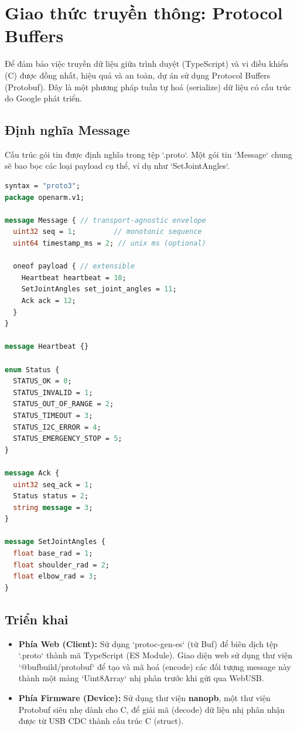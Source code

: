 \documentclass[12pt, a4paper, oneside]{report}
\numberwithin{equation}{chapter} %
\numberwithin{figure}{chapter}   %
\numberwithin{table}{chapter}    %
\begin{document}
\section{Giao thức truyền thông: Protocol Buffers}

Để đảm bảo việc truyền dữ liệu giữa trình duyệt (TypeScript) và vi điều khiển (C) được đồng nhất, hiệu quả và an toàn, dự án sử dụng Protocol Buffers (Protobuf). Đây là một phương pháp tuần tự hoá (serialize) dữ liệu có cấu trúc do Google phát triển.

\subsection{Định nghĩa Message}
Cấu trúc gói tin được định nghĩa trong tệp `.proto`. Một gói tin `Message` chung sẽ bao bọc các loại payload cụ thể, ví dụ như `SetJointAngles`.

\begin{lstlisting}[language=protobuf, caption={Định nghĩa gói tin trong tệp \texttt{messages.proto}}, label={lst:proto-def}, float=H]
syntax = "proto3";
package openarm.v1;

message Message { // transport-agnostic envelope
  uint32 seq = 1;         // monotonic sequence
  uint64 timestamp_ms = 2; // unix ms (optional)
  
  oneof payload { // extensible
    Heartbeat heartbeat = 10;
    SetJointAngles set_joint_angles = 11;
    Ack ack = 12;
  }
}

message Heartbeat {}

enum Status {
  STATUS_OK = 0;
  STATUS_INVALID = 1;
  STATUS_OUT_OF_RANGE = 2;
  STATUS_TIMEOUT = 3;
  STATUS_I2C_ERROR = 4;
  STATUS_EMERGENCY_STOP = 5;
}

message Ack {
  uint32 seq_ack = 1;
  Status status = 2;
  string message = 3;
}

message SetJointAngles {
  float base_rad = 1;
  float shoulder_rad = 2;
  float elbow_rad = 3;
}
\end{lstlisting}


\subsection{Triển khai}
\begin{itemize}
    \item \textbf{Phía Web (Client):} Sử dụng `protoc-gen-es` (từ Buf) để biên dịch tệp `.proto` thành mã TypeScript (ES Module). Giao diện web sử dụng thư viện `@bufbuild/protobuf` để tạo và mã hoá (encode) các đối tượng message này thành một mảng `Uint8Array` nhị phân trước khi gửi qua WebUSB.
    \item \textbf{Phía Firmware (Device):} Sử dụng thư viện \textbf{nanopb}, một thư viện Protobuf siêu nhẹ dành cho C, để giải mã (decode) dữ liệu nhị phân nhận được từ USB CDC thành cấu trúc C (struct).
\end{itemize}
\end{document}
